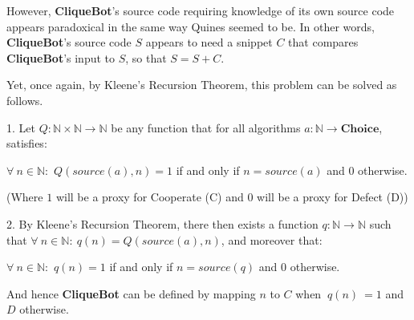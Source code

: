 However, \textbf{CliqueBot}'s source code requiring knowledge of its own source code appears paradoxical in the same way Quines seemed to be. In other words, \textbf{CliqueBot}'s source code $S$ appears to need a snippet $C$ that compares \textbf{CliqueBot}'s input to $S$, so that $S = S + C$.

Yet, once again, by Kleene's Recursion Theorem, this problem can be solved as follows.

1. Let $Q: \mathbb{N} \times \mathbb{N} \rightarrow \mathbb{N}$ be any function that for all algorithms $a: \mathbb{N} \rightarrow \textbf{Choice}$, satisfies:
\begin{center}
    $\forall\ n \in \mathbb{N}:$ $Q(source(a), n) = 1$ if and only if $n = source(a)$ and $0$ otherwise.
\end{center}
(Where $1$ will be a proxy for Cooperate (C) and $0$ will be a proxy for Defect (D))

2. By Kleene's Recursion Theorem, there then exists a function $q: \mathbb{N} \rightarrow \mathbb{N}$ such that $\forall\ n \in \mathbb{N}:\ q(n) = Q(source(a), n)$, and moreover that:
\begin{center}
    $\forall\ n \in \mathbb{N}:$ $q(n) = 1$ if and only if $n = source(q)$ and $0$ otherwise.
\end{center}

And hence \textbf{CliqueBot} can be defined by mapping $n$ to $C$ when $\ q(n)\ = 1$ and $D$ otherwise.
